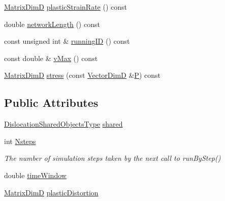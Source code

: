 \begin{DoxyCompactItemize}
\item 
\hyperlink{classmodel_1_1_dislocation_network_a9660c892fa8d51215f776fc13f073502}{Matrix\+Dim\+D} \hyperlink{classmodel_1_1_dislocation_network_a537147d65780d369bf0688169c1d96dc}{plastic\+Strain\+Rate} () const 
\item 
double \hyperlink{classmodel_1_1_dislocation_network_a73baac9c93cf1865740247b8eca0f183}{network\+Length} () const 
\item 
const unsigned int \& \hyperlink{classmodel_1_1_dislocation_network_a0d45a32a4f662377043375c92a4e3261}{running\+I\+D} () const 
\item 
const double \& \hyperlink{classmodel_1_1_dislocation_network_ae7cb981f96da4efa2cfdd6d21c7fca1b}{v\+Max} () const 
\item 
\hyperlink{classmodel_1_1_dislocation_network_a9660c892fa8d51215f776fc13f073502}{Matrix\+Dim\+D} \hyperlink{classmodel_1_1_dislocation_network_a530a84b2b9468b01c8124ff716923826}{stress} (const \hyperlink{classmodel_1_1_dislocation_network_a2825fa02c2f77fd9a08e3b9a2207cb00}{Vector\+Dim\+D} \&\hyperlink{_f_e_m_2linear__elasticity__3d_2tetgen_2generate_p_o_l_ycube_8m_a50a9afb44201a65ab7ad5feb2150aeb6}{P}) const 
\end{DoxyCompactItemize}
\subsection*{Public Attributes}
\begin{DoxyCompactItemize}
\item 
\hyperlink{classmodel_1_1_dislocation_network_a5f6775646c83fb5964cd18bf6d5f3200}{Dislocation\+Shared\+Objects\+Type} \hyperlink{classmodel_1_1_dislocation_network_aa4a706dc3b9e19527c01c7e4ecc9c002}{shared}
\item 
int \hyperlink{classmodel_1_1_dislocation_network_aa4e8518a5f4523613bb43000a1d935ea}{Nsteps}
\begin{DoxyCompactList}\small\item\em The number of simulation steps taken by the next call to run\+By\+Step() \end{DoxyCompactList}\item 
double \hyperlink{classmodel_1_1_dislocation_network_a33bf4f39364d860561c7e507a4dabb0c}{time\+Window}
\item 
\hyperlink{classmodel_1_1_dislocation_network_a9660c892fa8d51215f776fc13f073502}{Matrix\+Dim\+D} \hyperlink{classmodel_1_1_dislocation_network_aaad0e5eca7213651bb2d7bf5b87912ba}{plastic\+Distortion}
\end{DoxyCompactItemize}
